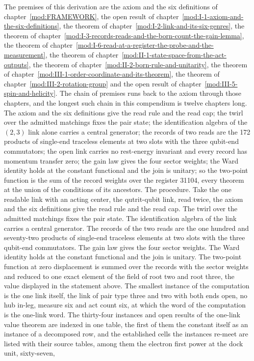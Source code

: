 \begin{chproof}
The premises of this derivation are the axiom and the six definitions of chapter~\ref{mod:FRAMEWORK}, the open result of chapter~\ref{mod:I-1-axiom-and-the-six-definitions}, the theorem of chapter~\ref{mod:I-2-link-and-its-six-genres}, the theorem of chapter~\ref{mod:I-3-records-reads-and-the-born-count-the-gain-lemma}, the theorem of chapter~\ref{mod:I-6-read-at-a-register-the-probe-and-the-measurement}, the theorem of chapter~\ref{mod:II-1-state-space-from-the-act-outputs}, the theorem of chapter~\ref{mod:II-2-born-rule-and-unitarity}, the theorem of chapter~\ref{mod:III-1-order-coordinate-and-its-theorem}, the theorem of chapter~\ref{mod:III-2-rotation-group} and the open result of chapter~\ref{mod:III-5-spin-and-helicity}. The chain of premises runs back to the axiom through those chapters, and the longest such chain in this compendium is twelve chapters long.
The axiom and the six definitions give the read rule and the read cap; the twirl over the admitted matchings fixes the pair state; the identification algebra of the $(2,3)$ link alone carries a central generator; the records of two reads are the 172 products of single-end traceless elements at two slots with the three qubit-end commutators; the open link carries no rest-energy invariant and every record has momentum transfer zero; the gain law gives the four sector weights; the Ward identity holds at the constant functional and the join is unitary; so the two-point function is the sum of the record weights over the register 31104, every theorem at the union of the conditions of its ancestors.
The procedure. Take the one readable link with an acting center, the qutrit-qubit link, read twice, the axiom and the six definitions give the read rule and the read cap. The twirl over the admitted matchings fixes the pair state. The identification algebra of the link carries a central generator. The records of the two reads are the one hundred and seventy-two products of single-end traceless elements at two slots with the three qubit-end commutators. The gain law gives the four sector weights. The Ward identity holds at the constant functional and the join is unitary. The two-point function at zero displacement is summed over the records with the sector weights and reduced to one exact element of the field of root two and root three, the value displayed in the statement above. The smallest instance of the computation is the one link itself, the link of pair type three and two with both ends open, no hub in-leg, measure six and act count six, at which the word of the computation is the one-link word. The thirty-four instances and open results of the one-link value theorem are indexed in one table, the first of them the constant itself as an instance of a decomposed row, and the established cells the instances re-meet are listed with their source tables, among them the electron first power at the dock unit, sixty-seven,

\end{chproof}
